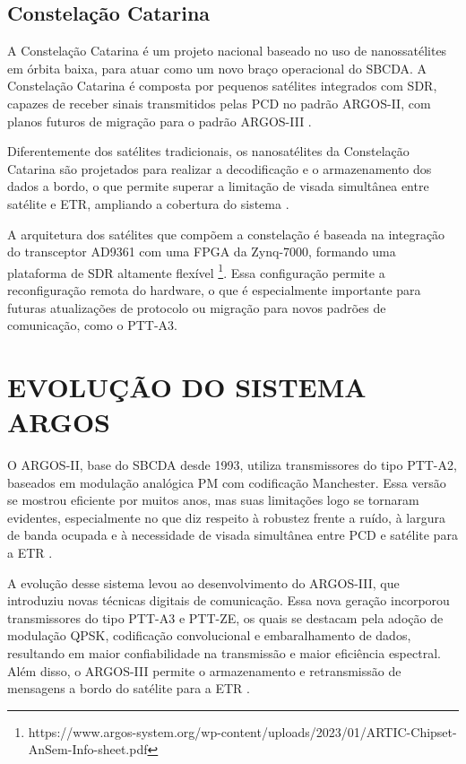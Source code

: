 \subsection{Constelação Catarina}

A Constelação Catarina é um projeto nacional baseado no uso de nanossatélites em órbita baixa, para atuar como um novo braço operacional do \gls{SBCDA}. A Constelação Catarina é composta por pequenos satélites integrados com \gls{SDR}, capazes de receber sinais transmitidos pelas \gls{PCD} no padrão \gls{ARGOS-II}, com planos futuros de migração para o padrão \gls{ARGOS-III} \cite{gomes_otimizacao_2024}.

Diferentemente dos satélites tradicionais, os nanosatélites da Constelação Catarina são projetados para realizar a decodificação e o armazenamento dos dados a bordo, o que permite superar a limitação de visada simultânea entre satélite e \gls{ETR}, ampliando a cobertura do sistema \cite{rodrigues_demodulador_2018}.

A arquitetura dos satélites que compõem a constelação é baseada na integração do transceptor \gls{AD9361} com uma \gls{FPGA} da \gls{Zynq-7000}, formando uma plataforma de \gls{SDR} altamente flexível \footnote{https://www.argos-system.org/wp-content/uploads/2023/01/ARTIC-Chipset-AnSem-Info-sheet.pdf}. Essa configuração permite a reconfiguração remota do hardware, o que é especialmente importante para futuras atualizações de protocolo ou migração para novos padrões de comunicação, como o \gls{PTT-A3}.


\section{EVOLUÇÃO DO SISTEMA ARGOS}\label{sec:quadros}

O \gls{ARGOS-II}, base do \gls{SBCDA} desde 1993, utiliza transmissores do tipo \gls{PTT-A2}, baseados em modulação analógica \gls{PM} com codificação Manchester. Essa versão se mostrou eficiente por muitos anos, mas suas limitações logo se tornaram evidentes, especialmente no que diz respeito à robustez frente a ruído, à largura de banda ocupada e à necessidade de visada simultânea entre \gls{PCD} e satélite para a \gls{ETR} \cite{cnes_services_and_message_formats_ed2_rev2_2006}.

A evolução desse sistema levou ao desenvolvimento do \gls{ARGOS-III}, que introduziu novas técnicas digitais de comunicação. Essa nova geração incorporou transmissores do tipo \gls{PTT-A3} e \gls{PTT-ZE}, os quais se destacam pela adoção de modulação \gls{QPSK}, codificação convolucional e embaralhamento de dados, resultando em maior confiabilidade na transmissão e maior eficiência espectral. Além disso, o \gls{ARGOS-III} permite o armazenamento e retransmissão de mensagens a bordo do satélite para a \gls{ETR} \cite{lima_parallel_2021, rodrigues_demodulador_2018}.

